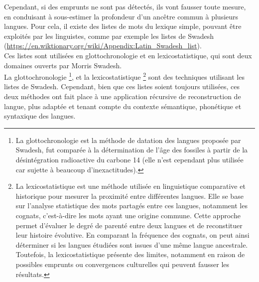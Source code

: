 \documentclass[12pt, french, twoside]{report}
\begin{document}
Cependant, si des emprunts ne sont pas détectés, ils vont fausser toute mesure, en conduisant à sous-estimer la profondeur d'un ancêtre commun à plusieurs langues. Pour cela, il existe des listes de mots du lexique simple, pouvant être exploités par les linguistes, comme par exemple les listes de Swadesh (\url{https://en.wiktionary.org/wiki/Appendix:Latin_Swadesh_list}).\\

Ces listes sont utilisées en glottochronologie et en lexicostatistique, qui sont deux domaines ouverts par Morris Swadesh.\\
\indent La glottochronologie \footnote{La glottochronologie est la méthode de datation des langues proposée par Swadesh, fut comparée à la détermination de l'âge des fossiles à partir de la désintégration radioactive du carbone 14 (elle n'est cependant plus utilisée car sujette à beaucoup d'inexactitudes).}, et la lexicostatistique \footnote{ La lexicostatistique est une méthode utilisée en linguistique comparative et historique pour mesurer la proximité entre différentes langues. Elle se base sur l'analyse statistique des mots partagés entre ces langues, notamment les cognats, c'est-à-dire les mots ayant une origine commune. Cette approche permet d'évaluer le degré de parenté entre deux langues et de reconstituer leur histoire évolutive. En comparant la fréquence des cognats, on peut ainsi déterminer si les langues étudiées sont issues d'une même langue ancestrale. Toutefois, la lexicostatistique présente des limites, notamment en raison de possibles emprunts ou convergences culturelles qui peuvent fausser les résultats.} sont des techniques utilisant les listes de Swadesh. Cependant, bien que ces listes soient toujours utilisées,  ces deux méthodes ont fait place à une application récursive de reconstruction de langue, plus adaptée et tenant compte du contexte sémantique, phonétique et syntaxique des langues.\\ 
\end{document}
